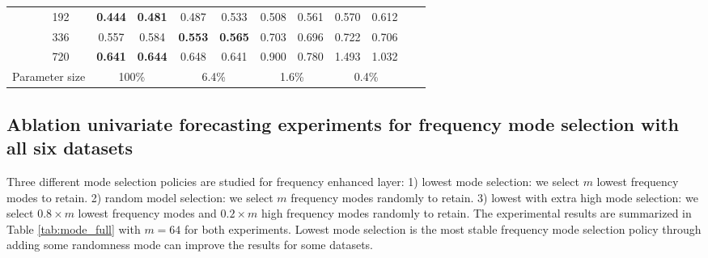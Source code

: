 \documentclass{article}
\begin{document}
\begin{table*}[h]
{\begin{tabular}{c|c|cccccccccc}
&192&\textbf{0.444}&\textbf{0.481}&0.487&0.533&0.508&0.561&0.570&0.612 \\

&336&0.557&0.584&\textbf{0.553}&\textbf{0.565}&0.703&0.696&0.722&0.706 \\

&720&\textbf{0.641}&\textbf{0.644}&0.648&0.641&0.900&0.780&1.493&1.032 \\

\midrule
\multicolumn{2}{c|}{Parameter size}&\multicolumn{2}{c|}{100\%}&\multicolumn{2}{c|}{6.4\%}&\multicolumn{2}{c|}{1.6\%}&\multicolumn{2}{c}{0.4\%}\\
\bottomrule
\end{tabular}
\label{tab:FEL_LRA_FULL}
}
\end{table*}
%
 
\subsection{Ablation univariate forecasting experiments for frequency mode selection with all six datasets}
Three different mode selection policies are studied for frequency enhanced layer: 1) lowest mode selection: we select $m$ lowest frequency modes to retain. 2) random model selection: we select $m$ frequency modes randomly to retain. 3) lowest with extra high mode selection: we select $0.8\times m$ lowest frequency modes and $0.2\times m$ high frequency modes randomly to retain. The experimental results are summarized in Table \ref{tab:mode_full} with $m = 64$ for both experiments. Lowest mode selection is the most stable frequency mode selection policy through adding some randomness mode can improve the results for some datasets.
\end{document}
